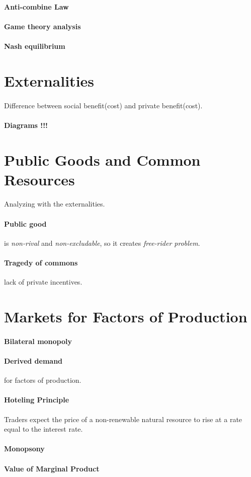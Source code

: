 \documentclass{article}
\begin{document}
	\paragraph{Anti-combine Law}
	\paragraph{Game theory analysis}
	\paragraph{Nash equilibrium}
	\section{Externalities}
	\paragraph{}Difference between social benefit(cost) and private benefit(cost).
	\paragraph{Diagrams !!!}
	\section{Public Goods and Common Resources}
	\paragraph{} Analyzing with the externalities.
	\paragraph{Public good} is \emph{non-rival} and \emph{non-excludable}, so it creates \emph{free-rider problem}.
	\paragraph{Tragedy of commons} lack of private incentives.
	\section{Markets for Factors of Production}
	\paragraph{Bilateral monopoly}
	\paragraph{Derived demand} for factors of production.
	\paragraph{Hoteling Principle} Traders expect the price of a non-renewable natural resource to rise at a rate equal to the interest rate.
	\paragraph{Monopsony}
	\paragraph{Value of Marginal Product}
\end{document}
